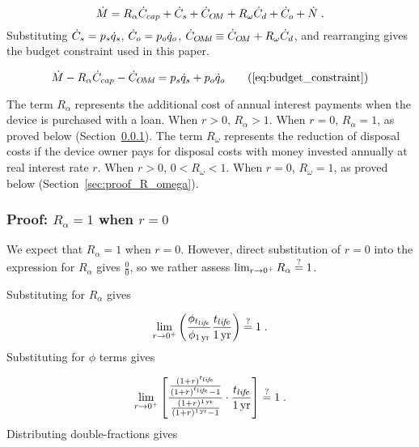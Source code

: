 \begin{equation}
  \dot{M} = R_\alpha \dot{C}_{cap} + 
             \dot{C}_s + 
             \dot{C}_{O\!M} + 
             R_\omega \dot{C}_d + 
             \dot{C}_o + 
             \dot{N} \; .
\end{equation}
%
Substituting $\dot{C}_s = p_s \dot{q}_s$,  
$\dot{C}_o = p_o \dot{q}_o$, $\dot{C}_{O\!M\!d} \equiv \dot{C}_{O\!M} + R_\omega \dot{C}_d$, and rearranging gives
the budget constraint used in this paper.

\begin{equation}
  \budgetconstraint \tag{\ref{eq:budget_constraint}}
\end{equation}

The term $R_\alpha$ represents the additional cost of annual interest
payments when the device is purchased with a loan.
When $r > 0$, $R_\alpha > 1$.
When $r = 0$, $R_\alpha = 1$, as proved below
(Section~\ref{sec:proof_R_alpha}).
The term $R_\omega$ represents the reduction of disposal costs 
if the device owner pays for disposal costs with money
invested annually at real interest rate $r$. 
When $r > 0$, $0 < R_\omega < 1$.
When $r = 0$, $R_\omega = 1$, as proved below
(Section~\ref{sec:proof_R_omega}).


\subsubsection{Proof: $R_\alpha = 1$ when $r = 0$}
\label{sec:proof_R_alpha}

We expect that $R_\alpha = 1$ when $r = 0$.
However, direct substitution of $r = 0$ into the expression
for $R_\alpha$ gives $\frac{0}{0}$, 
so we rather assess
$\lim_{r \to 0^+} R_\alpha \stackrel{?}{=} 1$.

Substituting for $R_\alpha$ gives

\begin{equation}
  \lim_{r \to 0^+} \left( \frac{\phi_{t_{li\!f\!e}}}{\phi_{1\,\mathrm{yr}}} \frac{t_{li\!f\!e}}{1\,\mathrm{yr}} \right) 
  \stackrel{?}{=} 1 \; .
\end{equation}
%
Substituting for $\phi$ terms gives

\begin{equation}
  \lim_{r \to 0^+} \left[ \frac{\frac{(1 + r)^{t_{li\!f\!e}}}{(1 + r)^{t_{li\!f\!e}} - 1}}{\frac{(1 + r)^{1\,\mathrm{yr}}}{(1 + r)^{1\,\mathrm{yr}} - 1}} \cdot \frac{t_{li\!f\!e}}{1\,\mathrm{yr}} \right] \stackrel{?}{=} 1 \; .
\end{equation}
%
Distributing double-fractions gives

